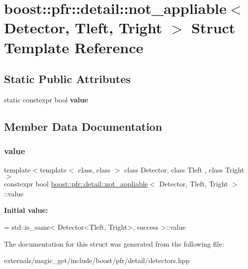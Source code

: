 \hypertarget{structboost_1_1pfr_1_1detail_1_1not__appliable}{}\section{boost\+:\+:pfr\+:\+:detail\+:\+:not\+\_\+appliable$<$ Detector, Tleft, Tright $>$ Struct Template Reference}
\label{structboost_1_1pfr_1_1detail_1_1not__appliable}
\subsection*{Static Public Attributes}
\begin{DoxyCompactItemize}
\item 
static constexpr bool {\bfseries value}
\end{DoxyCompactItemize}


\subsection{Member Data Documentation}
\mbox{\label{structboost_1_1pfr_1_1detail_1_1not__appliable_a0af6703f89fb4c13904b463955118e22}} 
\subsubsection{\texorpdfstring{value}{value}}
{\footnotesize\ttfamily template$<$template$<$ class, class $>$ class Detector, class Tleft , class Tright $>$ \\
constexpr bool \mbox{\hyperlink{structboost_1_1pfr_1_1detail_1_1not__appliable}{boost\+::pfr\+::detail\+::not\+\_\+appliable}}$<$ Detector, Tleft, Tright $>$\+::value\hspace{0.3cm}{\ttfamily [static]}}

{\bfseries Initial value\+:}
\begin{DoxyCode}
= std::is\_same<
            Detector<Tleft, Tright>,
            success
        >::value
\end{DoxyCode}


The documentation for this struct was generated from the following file\+:\begin{DoxyCompactItemize}
\item 
externals/magic\+\_\+get/include/boost/pfr/detail/detectors.\+hpp\end{DoxyCompactItemize}
